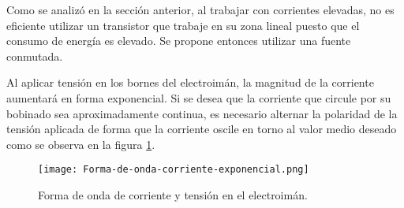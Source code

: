 Como se analizó en la sección anterior, al trabajar con corrientes elevadas, no es eficiente utilizar un transistor que trabaje en su zona lineal puesto que el consumo de energía es elevado. Se propone entonces utilizar una fuente conmutada.


Al aplicar tensión en los bornes del electroimán, la magnitud de la corriente aumentará en forma exponencial. Si se desea que la corriente que circule por su bobinado sea aproximadamente continua, es necesario alternar la polaridad de la tensión aplicada de forma que la corriente oscile en torno al valor medio deseado como se observa en la figura \ref{fig:img_corriente_exponencial}.

\begin{figure}[H]
	\centering
	\texttt{[image: Forma-de-onda-corriente-exponencial.png]}
	\caption{Forma de onda de corriente y tensión en el electroimán.}
	\label{fig:img_corriente_exponencial}
\end{figure}



